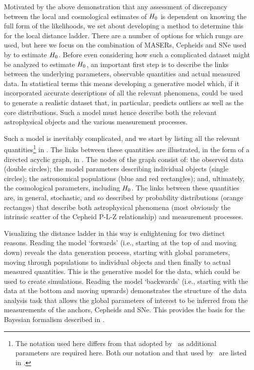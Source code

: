 \documentclass[a4paper,fleqn,usenatbib]{mnras}
\newcommand{\riess}{\citetalias{Riess_etal:2016}}
\begin{document}
{Motivated by the above demonstration that any assessment of 
discrepancy between the local and cosmological estimates of $H_0$
is dependent on knowing the full form of the likelihoods,
we set about developing a method to determine this for the 
local distance ladder.
There are a number of options for which rungs are used,
but here we focus on the 
combination of MASERs, Cepheids and SNe 
used by 
\cite{Riess_etal:2009,Riess_etal:2011,Riess_etal:2016} to estimate $H_0$.
Before even considering how such a complicated
dataset might be analyzed to 
estimate $H_0$, an important first step is to describe the 
links between the underlying parameters, observable quantities 
and actual measured data.  
In statistical terms this means developing a generative model
which, if it incorporated accurate
descriptions of all the relevant phenomena,
could be used to generate a realistic dataset that,
in particular, predicts outliers as well as the core distributions.
Such a model must hence describe both the relevant
astrophysical objects and the various measurement processes.

Such a model is inevitably complicated, and we start by listing all the relevant quantities\footnote{The notation used here differs from that adopted by \riess\ as additional parameters are required here.  Both our notation and that used by \riess\ are listed in .} in . The links between these quantities are illustrated, in the form of a directed acyclic graph, in .  The nodes of the graph consist of: the observed data (double circles); the model parameters describing individual objects (single circles); the astronomical populations (blue and red rectangles); and, ultimately, the cosmological parameters, including $H_0$.  The links between these quantities are, in general, stochastic, and so described by probability distributions (orange rectanges) that describe both astrophysical phenomena (most obviously the intrinsic scatter of the Cepheid P-L-Z relationship) and measurement processes.

Visualizing the distance ladder in this way is enlightening for two distinct reasons. Reading the model `forwards' (i.e., starting at the top of  and moving down) reveals the data generation process, starting with global parameters, moving through populations to individual objects and then finally to actual measured quantities.  This is the generative model for the data, which could be used to create simulations. Reading the model `backwards' (i.e., starting with the data at the bottom and moving upwards) demonstrates the structure of the data analysis task that allows the global parameters of interest to be inferred from the measurements of the anchors, Cepheids and SNe.  This provides the basis for the Bayesian formalism described in .

}
\end{document}
